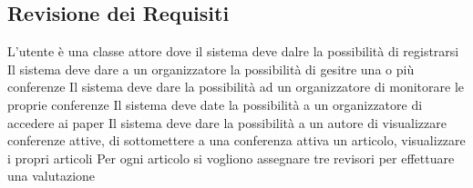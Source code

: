\subsection{Revisione dei Requisiti}
\label{sec:revisione_requisiti}


L'utente è una classe attore dove il sistema deve dalre la possibilità di registrarsi
Il sistema deve dare a un organizzatore la possibilità di gesitre una o più conferenze
Il sistema deve dare la possibilità ad un organizzatore di monitorare le proprie conferenze
Il sistema deve date la possibilità a un organizzatore di accedere ai paper
Il sistema deve dare la possibilità a un autore di visualizzare conferenze attive, di sottomettere a una conferenza attiva un articolo, visualizzare i propri articoli
Per ogni articolo si vogliono assegnare tre revisori per effettuare una valutazione


